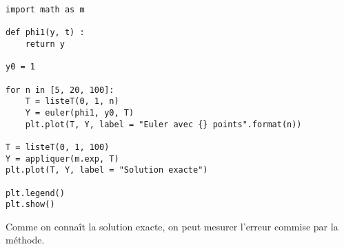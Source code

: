\begin{Answer}
\begin{lstlisting}
import math as m

def phi1(y, t) :
    return y

y0 = 1

for n in [5, 20, 100]:
    T = listeT(0, 1, n)
    Y = euler(phi1, y0, T)
    plt.plot(T, Y, label = "Euler avec {} points".format(n))

T = listeT(0, 1, 100)
Y = appliquer(m.exp, T)
plt.plot(T, Y, label = "Solution exacte")

plt.legend()
plt.show()
\end{lstlisting}
\end{Answer}

\medskip

Comme on connaît la solution exacte, on peut mesurer l'erreur commise par la méthode.

